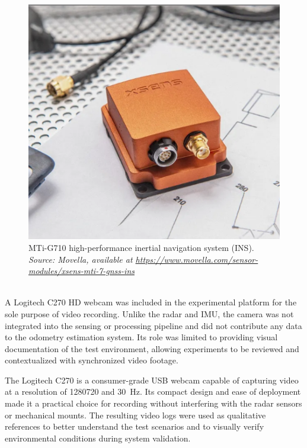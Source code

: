 \begin{figure}[!htbp]
    \centering
    \includegraphics[width=1.0\linewidth]{images/mti_g710.png}
    \caption{MTi-G710 high-performance inertial navigation system (INS).\\
    \textit{Source: Movella, available at \url{https://www.movella.com/sensor-modules/xsens-mti-7-gnss-ins}}}
    \label{fig:MTi-G710 sensor}
\end{figure}

\hfill
\\
A Logitech C270 HD webcam was included in the experimental platform for the sole purpose of video recording.  
Unlike the radar and IMU, the camera was not integrated into the sensing or processing pipeline and did not contribute any data to the odometry estimation system.  
Its role was limited to providing visual documentation of the test environment, allowing experiments to be reviewed and contextualized with synchronized video footage.  

The Logitech C270 is a consumer-grade USB webcam capable of capturing video at a resolution of \SI{1280}{\times}\SI{720}{} and \SI{30}{\hertz}.  
Its compact design and ease of deployment made it a practical choice for recording without interfering with the radar sensors or mechanical mounts.  
The resulting video logs were used as qualitative references to better understand the test scenarios and to visually verify environmental conditions during system validation.  
